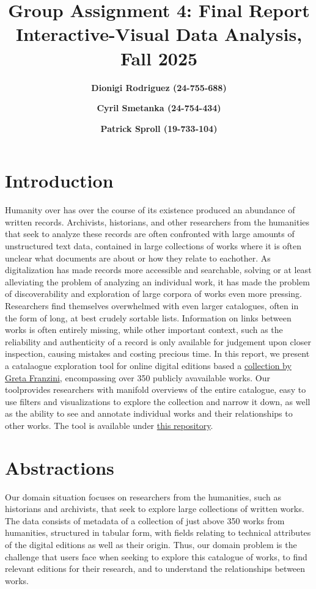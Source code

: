 \documentclass{article}
\title{Group Assignment 4: Final Report \\ \small Interactive-Visual Data Analysis, Fall 2025}
\author{
\textbf{Dionigi Rodriguez (24-755-688)} \and
\textbf{Cyril Smetanka (24-754-434)} \and
\textbf{Patrick Sproll (19-733-104)}
}
\begin{document}
\maketitle

\section{Introduction}

Humanity over has over the course of its existence produced an abundance of written records. Archivists, historians, and other researchers from the humanities
that seek to analyze these records are often confronted with large amounts of unstructured text data, contained in large collections of works where it is often 
unclear what documents are about or how they relate to eachother. %
As digitalization has made records more accessible and searchable, solving or at least alleviating the problem of analyzing an individual work, it has 
made the problem of discoverability and exploration of large corpora of works even more pressing. Researchers find themselves overwhelmed with even 
larger catalogues, often in the form of long, at best crudely sortable lists. Information on links between works is often entirely missing, while other important context, 
such as the reliability and authenticity of a record is only available for judgement upon closer inspection, causing mistakes and costing precious time.  %
In this report, we present a catalaogue exploration tool for online digital editions based a \href{https://github.com/dig-Eds-cat/digEds_cat/blob/main/digEds_cat.csv}{collection by Greta Franzini}, encompassing over 350 publicly avavailable works.
Our toolprovides researchers with manifold overviews of the entire catalogue, easy to use filters and visualizations to explore the collection and narrow it down,
 as well as the ability to see and annotate individual works and their relationships to other works.  
The tool is available under \href{https://github.com/Di0nigi/IVDAProject}{this repository}. %


\section{Abstractions}

Our domain situation focuses on researchers from the humanities, such as historians and archivists, that seek to explore large collections of written works. 
The data consists of metadata of a collection of just above 350 works from humanities, structured in tabular form, with fields relating to technical attributes of the digital editions as well as their origin.
Thus, our domain problem is the challenge that users face when seeking to explore this catalogue of works, to find relevant editions for their research, and to understand the relationships between works.
\end{document}
